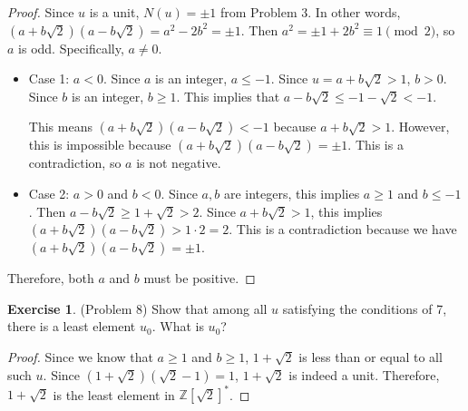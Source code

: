 \documentclass[12pt, psamsfonts]{amsart}
\theoremstyle{definition}
\newtheorem*{exer}{Exercise}
\theoremstyle{remark}
\numberwithin{equation}{section}
\begin{document}
\begin{proof}
  Since $u$ is a unit, $N(u) = \pm 1$ from Problem 3.
  In other words, $(a + b\sqrt{2})(a - b\sqrt{2}) = a^2 - 2b^2 = \pm 1$.
  Then $a^2 = \pm 1 + 2b^2 \equiv 1 \pmod 2$, so $a$ is odd.
  Specifically, $a \ne 0$.
  \begin{itemize}
    \item
      Case 1: $a < 0$.
      Since $a$ is an integer, $a \leq -1$.
      Since $u = a + b\sqrt{2} > 1$, $b > 0$.
      Since $b$ is an integer, $b \geq 1$.
      This implies that $a - b\sqrt{2} \leq -1 - \sqrt{2} < -1$.

      This means $(a + b\sqrt{2})(a - b\sqrt{2}) < -1$ because $a + b\sqrt{2} > 1$.
      However, this is impossible because $(a + b\sqrt{2})(a - b\sqrt{2}) = \pm 1$.
      This is a contradiction, so $a$ is not negative.
    \item
      Case 2: $a > 0$ and $b < 0$.
      Since $a, b$ are integers, this implies $a \geq 1$ and $b \leq -1$.
      Then $a - b\sqrt{2} \geq 1 + \sqrt{2} > 2$.
      Since $a + b\sqrt{2} > 1$, this implies $(a + b\sqrt{2})(a - b\sqrt{2}) > 1 \cdot 2 = 2$.
      This is a contradiction because we have $(a + b\sqrt{2})(a - b\sqrt{2}) = \pm 1$.
  \end{itemize}
  Therefore, both $a$ and $b$ must be positive.
\end{proof}

\begin{exer}{(Problem 8)}
  Show that among all $u$ satisfying the conditions of 7, there is a least element $u_0$.
  What is $u_0$?
\end{exer}

\begin{proof}
  Since we know that $a \geq 1$ and $b \geq 1$, $1 + \sqrt{2}$ is less than or equal to all such $u$.
  Since $(1 + \sqrt{2})(\sqrt{2} - 1) = 1$, $1 + \sqrt{2}$ is indeed a unit.
  Therefore, $1 + \sqrt{2}$ is the least element in $\mathbb{Z}[\sqrt{2}]^*$.
\end{proof}
\end{document}
